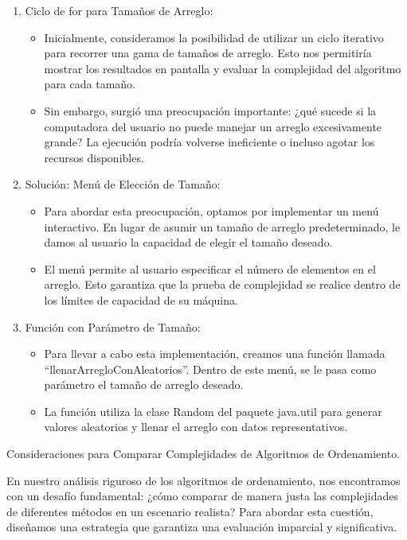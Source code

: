 \documentclass[12pt]{article}
\begin{document}
\begin{enumerate}
    \item Ciclo de for para Tamaños de Arreglo:
          \begin{itemize}
              \item Inicialmente, consideramos la posibilidad de utilizar un ciclo iterativo para recorrer una gama de tamaños de arreglo. Esto nos permitiría mostrar los resultados en pantalla y evaluar la complejidad del algoritmo para cada tamaño.
              \item Sin embargo, surgió una preocupación importante: ¿qué sucede si la computadora del usuario no puede manejar un arreglo excesivamente grande? La ejecución podría volverse ineficiente o incluso agotar los recursos disponibles.
          \end{itemize}
    \item Solución: Menú de Elección de Tamaño:
          \begin{itemize}
              \item Para abordar esta preocupación, optamos por implementar un menú interactivo. En lugar de asumir un tamaño de arreglo predeterminado, le damos al usuario la capacidad de elegir el tamaño deseado.
              \item El menú permite al usuario especificar el número de elementos en el arreglo. Esto garantiza que la prueba de complejidad se realice dentro de los límites de capacidad de su máquina.
          \end{itemize}
    \item Función con Parámetro de Tamaño:
          \begin{itemize}
              \item Para llevar a cabo esta implementación, creamos una función llamada “llenarArregloConAleatorios”. Dentro de este menú, se le pasa como parámetro el tamaño de arreglo deseado.
              \item La función utiliza la clase Random del paquete java.util para generar valores aleatorios y llenar el arreglo con datos representativos.
          \end{itemize}
\end{enumerate}
\par\vspace{0.4cm}
Consideraciones para Comparar Complejidades de Algoritmos de Ordenamiento.
\par\vspace{0.4cm}
En nuestro análisis riguroso de los algoritmos de ordenamiento, nos encontramos con un desafío fundamental: ¿cómo comparar de manera justa las complejidades de diferentes métodos en un escenario realista? Para abordar esta cuestión, diseñamos una estrategia que garantiza una evaluación imparcial y significativa.
\end{document}
